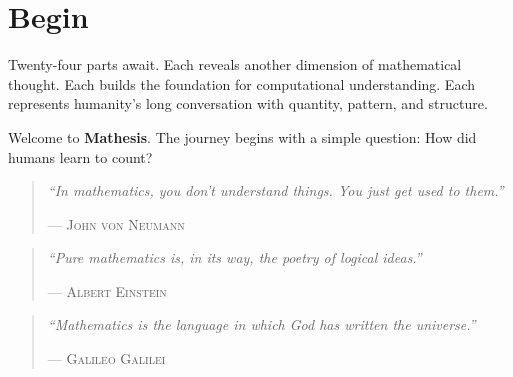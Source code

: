 \section*{Begin}

Twenty-four parts await. Each reveals another dimension of mathematical thought. Each builds the foundation for computational understanding. Each represents humanity's long conversation with quantity, pattern, and structure.

Welcome to \textbf{Mathesis}. The journey begins with a simple question: How did humans learn to count?

\vfill

\begin{quote}
\textit{``In mathematics, you don't understand things. You just get used to them.''}

\hfill--- \textsc{John von Neumann}
\end{quote}

\begin{quote}
\textit{``Pure mathematics is, in its way, the poetry of logical ideas.''}

\hfill--- \textsc{Albert Einstein}
\end{quote}

\begin{quote}
\textit{``Mathematics is the language in which God has written the universe.''}

\hfill--- \textsc{Galileo Galilei}
\end{quote}

\clearpage